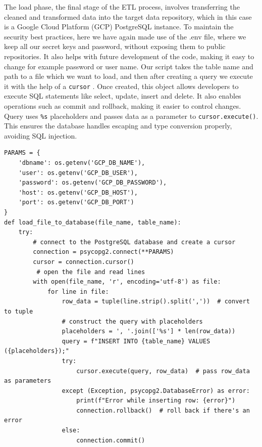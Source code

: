 The load phase, the final stage of the ETL process, involves transferring the cleaned and transformed data into the target data repository, which in this case is a Google Cloud Platform (GCP) PostgreSQL \cite{Postgres} instance. To maintain the security best practices, here we have again made use of the .env file, where we keep all our secret keys and password, without exposing them to public repositories. It also helps with future development of the code, making it easy to change for example password or user name. Our script takes the table name and path to a file which we want to load, and then after creating a query we execute it with the help of a \texttt{cursor} \cite{python-cursor}. Once created, this object allows developers to execute SQL statements like select, update, insert and delete. It also enables operations such as commit and rollback, making it easier to control changes. Query uses \texttt{\%s}  placeholders and passes data as a parameter to \texttt{cursor.execute()}. This ensures the database handles escaping and type conversion properly, avoiding SQL injection.
{
\begin{verbatim}
PARAMS = {
    'dbname': os.getenv('GCP_DB_NAME'),
    'user': os.getenv('GCP_DB_USER'),
    'password': os.getenv('GCP_DB_PASSWORD'),
    'host': os.getenv('GCP_DB_HOST'),
    'port': os.getenv('GCP_DB_PORT')
}
def load_file_to_database(file_name, table_name):
    try:
        # connect to the PostgreSQL database and create a cursor
        connection = psycopg2.connect(**PARAMS)
        cursor = connection.cursor()
         # open the file and read lines
        with open(file_name, 'r', encoding='utf-8') as file:
            for line in file:
                row_data = tuple(line.strip().split(','))  # convert to tuple
                # construct the query with placeholders
                placeholders = ', '.join(['%s'] * len(row_data))
                query = f"INSERT INTO {table_name} VALUES ({placeholders});"
                try:
                    cursor.execute(query, row_data)  # pass row_data as parameters
                except (Exception, psycopg2.DatabaseError) as error:
                    print(f"Error while inserting row: {error}")
                    connection.rollback()  # roll back if there's an error
                else:
                    connection.commit()
\end{verbatim}
\label{fig:Load to DB}
}
\par
